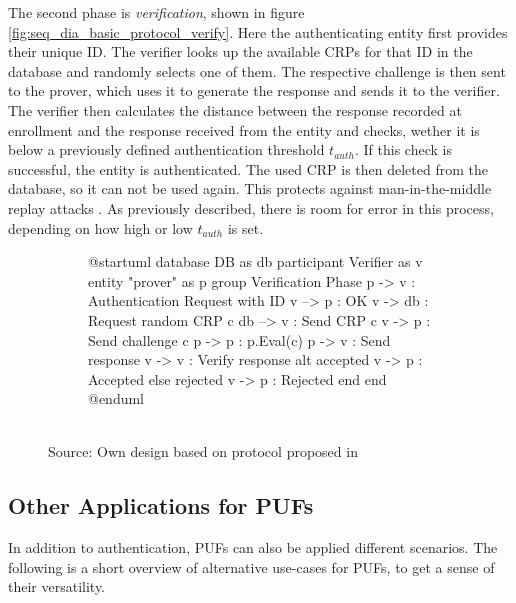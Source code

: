 The second phase is \emph{verification}, shown in figure \ref{fig:seq_dia_basic_protocol_verify}.
Here the authenticating entity first provides their unique ID.
The verifier looks up the available \acp{CRP} for that ID in the database and randomly selects one of them.
The respective challenge is then sent to the prover, which uses it to generate the response and sends it to
the verifier. The verifier then calculates the distance between the response recorded at enrollment
and the response received from the entity and checks, wether it is below a
previously defined authentication threshold $t_{auth}$.
If this check is successful, the entity is authenticated. The used CRP is then deleted from the database, so it
can not be used again. This protects against man-in-the-middle replay attacks \cite[][p. 130]{Maes2013}.
As previously described, there is room for error in this process, depending on how high or low $t_{auth}$ is set.

\begin{figure}[h]
    \centering
    \caption{UML Sequence Diagram showing the Verification Phase in the Basic Protocol}
    \label{fig:seq_dia_basic_protocol_verify}
    \begin{subfigure}{0.8\textwidth}
        \begin{plantuml}
            @startuml
            database DB as db
            participant Verifier as v
            entity "prover" as p
            group Verification Phase
            p -> v : Authentication Request with ID
            v --> p : OK
            v -> db : Request random CRP c
            db --> v : Send CRP c
            v -> p : Send challenge c
            p -> p : p.Eval(c)
            p -> v : Send response
            v -> v : Verify response
            alt accepted
            v -> p : Accepted
            else rejected
            v -> p : Rejected
            end
            end
            @enduml
        \end{plantuml}
    \end{subfigure}
    \\
    Source: Own design based on protocol proposed in \cite[][p. 129f]{Maes2013}
\end{figure}

\subsection{Other Applications for PUFs}
\label{sec:puf_applications}

In addition to authentication, PUFs can also be applied different scenarios.
The following is a short overview of alternative use-cases for PUFs, to get a sense of their
versatility.

